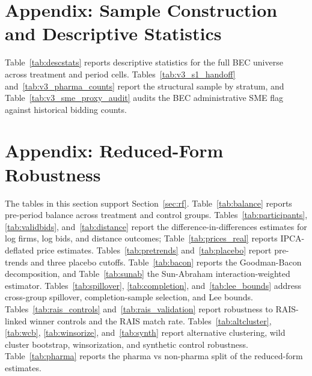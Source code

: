 \clearpage
\appendix

\section{Appendix: Sample Construction and Descriptive Statistics}\label{app:sample}

Table~\ref{tab:descstats} reports descriptive statistics for the full BEC universe across treatment and period cells. Tables~\ref{tab:v3_s1_handoff} and~\ref{tab:v3_pharma_counts} report the structural sample by stratum, and Table~\ref{tab:v3_sme_proxy_audit} audits the BEC administrative SME flag against historical bidding counts.






\section{Appendix: Reduced-Form Robustness}\label{app:rf}

The tables in this section support Section~\ref{sec:rf}. Table~\ref{tab:balance} reports pre-period balance across treatment and control groups. Tables~\ref{tab:participants}, \ref{tab:validbids}, and~\ref{tab:distance} report the difference-in-differences estimates for log firms, log bids, and distance outcomes; Table~\ref{tab:prices_real} reports IPCA-deflated price estimates. Tables~\ref{tab:pretrends} and~\ref{tab:placebo} report pre-trends and three placebo cutoffs. Table~\ref{tab:bacon} reports the Goodman-Bacon decomposition, and Table~\ref{tab:sunab} the Sun-Abraham interaction-weighted estimator. Tables~\ref{tab:spillover}, \ref{tab:completion}, and~\ref{tab:lee_bounds} address cross-group spillover, completion-sample selection, and Lee bounds. Tables~\ref{tab:rais_controls} and~\ref{tab:rais_validation} report robustness to RAIS-linked winner controls and the RAIS match rate. Tables~\ref{tab:altcluster}, \ref{tab:wcb}, \ref{tab:winsorize}, and~\ref{tab:synth} report alternative clustering, wild cluster bootstrap, winsorization, and synthetic control robustness. Table~\ref{tab:pharma} reports the pharma vs non-pharma split of the reduced-form estimates.

